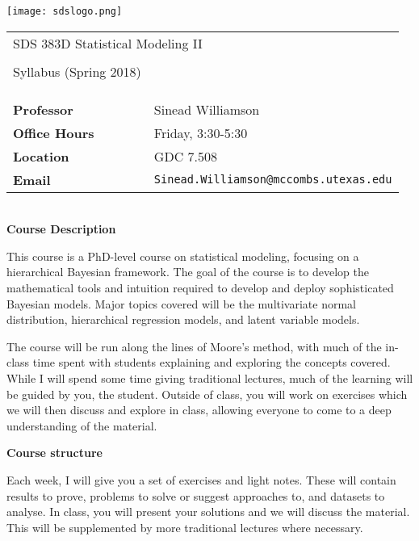 \documentclass[11pt]{article}
\begin{document}
\newcommand{\Prob}{\mathbf{P}}

\texttt{[image: sdslogo.png]}


\begin{tabular}{ p{3in} l }
 \multicolumn{2}{l}{\LARGE SDS 383D Statistical Modeling II} \\\\
   \Large Syllabus (Spring 2018)\\\\\\\\
  \textbf{Professor} & Sinead Williamson\\
  \textbf{Office Hours} & Friday, 3:30-5:30\\
  \textbf{Location} & GDC 7.508\\
  \textbf{Email} & \texttt{Sinead.Williamson@mccombs.utexas.edu}\\
\end{tabular}



\vspace*{1in}

\textbf {\large \\ Course Description}


This course is a PhD-level course on statistical modeling, focusing on a hierarchical Bayesian framework. The goal of the course is to develop the mathematical tools and intuition required to develop and deploy sophisticated Bayesian models. Major topics covered will be the multivariate normal distribution, hierarchical regression models, and latent variable models. 

The course will be run along the lines of Moore's method, with much of the in-class time spent with students explaining and exploring the concepts covered. While I will spend some time giving traditional lectures, much of the learning will be guided by you, the student. Outside of class, you will work on exercises which we will then discuss and explore in class, allowing everyone to come to a deep understanding of the material.

\vspace{5mm}

\textbf{Course structure}

Each week, I will give you a set of exercises and light notes. These will contain results to prove, problems to solve or suggest approaches to, and datasets to analyse. In class, you will present your solutions and we will discuss the material. This will be supplemented by more traditional lectures where necessary.
\end{document}
